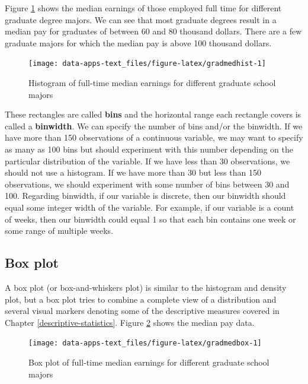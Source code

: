 \documentclass[
]{book}
\begin{document}
Figure \ref{fig:gradmedhist} shows the median earnings of those employed full time for different graduate degree majors. We can see that most graduate degrees result in a median pay for graduates of between 60 and 80 thousand dollars. There are a few graduate majors for which the median pay is above 100 thousand dollars.

\begin{figure}

{\centering \texttt{[image: data-apps-text\_files/figure-latex/gradmedhist-1]} 

}

\caption{Histogram of full-time median earnings for different graduate school majors}\label{fig:gradmedhist}
\end{figure}

These rectangles are called \textbf{bins} and the horizontal range each rectangle covers is called a \textbf{binwidth}. We can specify the number of bins and/or the binwidth. If we have more than 150 observations of a continuous variable, we may want to specify as many as 100 bins but should experiment with this number depending on the particular distribution of the variable. If we have less than 30 observations, we should not use a histogram. If we have more than 30 but less than 150 observations, we should experiment with some number of bins between 30 and 100. Regarding binwidth, if our variable is discrete, then our binwidth should equal some integer width of the variable. For example, if our variable is a count of weeks, then our binwidth could equal 1 so that each bin contains one week or some range of multiple weeks.

\hypertarget{box-plot}{%
\subsection{Box plot}\label{box-plot}}

A box plot (or box-and-whiskers plot) is similar to the histogram and density plot, but a box plot tries to combine a complete view of a distribution and several visual markers denoting some of the descriptive measures covered in Chapter \ref{descriptive-statistics}. Figure \ref{fig:gradmedbox} shows the median pay data.

\begin{figure}

{\centering \texttt{[image: data-apps-text\_files/figure-latex/gradmedbox-1]} 

}

\caption{Box plot of full-time median earnings for different graduate school majors}\label{fig:gradmedbox}
\end{figure}
\end{document}
